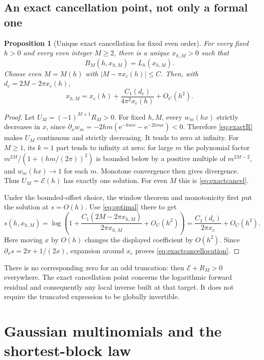 \documentclass[11pt,a4paper]{article}
\newcommand{\ee}{\mathrm e}
\newcommand{\E}{\mathcal E}
\numberwithin{equation}{section}
\theoremstyle{plain}
\newtheorem{proposition}[theorem]{Proposition}
\theoremstyle{definition}
\theoremstyle{remark}
\begin{document}
\subsection{An exact cancellation point, not only a formal one}
\begin{proposition}[Unique exact cancellation for fixed even order]
\label{prop:exactcancel}
For every fixed $h>0$ and every even integer $M\ge2$, there is a unique
$x_{h,M}>0$ such that
\begin{equation}
 B_M(h,x_{h,M})=L_h(x_{h,M}).
 \label{eq:exactcancel}
\end{equation}
Choose even $M=M(h)$ with $|M-\pi x_c(h)|\le C$. Then, with
$d_c=2M-2\pi x_c(h)$,
\begin{equation}
 x_{h,M}=x_c(h)+\frac{C_1(d_c)}{4\pi^2x_c(h)}+O_C(h^2).
 \label{eq:exactcancellocation}
\end{equation}
\end{proposition}
\begin{proof}
Let $U_M=(-1)^{M+1}R_M>0$. For fixed $h,M$, every $w_m(hx)$ strictly
 decreases in $x$, since
$\partial_xw_m=-2hm(\ee^{-hmx}-\ee^{-2hmx})<0$.
Therefore \eqref{eq:exactR} makes $U_M$ continuous and strictly decreasing.
It tends to zero at infinity. For $M\ge1$, its $k=1$ part tends to infinity
at zero: for large $m$ the polynomial factor
$m^{2M}/(1+(hm/(2\pi))^2)$ is bounded below by a positive multiple of
$m^{2M-2}$, and $w_m(hx)\to1$ for each $m$. Monotone convergence then gives
divergence. Thus $U_M=\E(h)$ has exactly one solution. For even $M$ this is
\eqref{eq:exactcancel}.

Under the bounded-offset choice, the window theorem and monotonicity first
put the solution at $s=O(h)$. Use \eqref{eq:optimal} there to get
\[
 s(h,x_{h,M})=\log\left(1+\frac{C_1(2M-2\pi x_{h,M})}{2\pi x_{h,M}}
                                  +O_C(h^2)\right)
               =\frac{C_1(d_c)}{2\pi x_c}+O_C(h^2).
\]
Here moving $x$ by $O(h)$ changes the displayed coefficient by $O(h^2)$.
Since $\partial_xs=2\pi+1/(2x)$, expansion around $x_c$ proves
\eqref{eq:exactcancellocation}.
\end{proof}

There is no corresponding zero for an odd truncation: then
$\E+R_M>0$ everywhere. The exact cancellation point concerns the logarithmic
forward residual and consequently any local inverse built at that target.
It does not require the truncated expression to be globally invertible.

\section{Gaussian multinomials and the shortest-block law}
\label{sec:multi}
\end{document}
